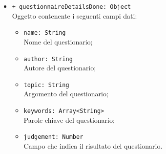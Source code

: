 \begin{itemize}
\begin{itemize}
			\item \texttt{+ questionnaireDetailsDone: Object} \\ Oggetto contenente i seguenti campi dati:
			\begin{itemize}
				\item \texttt{name: String}\\ Nome del questionario;
				\item \texttt{author: String}\\ Autore del questionario;
				\item \texttt{topic: String}\\ Argomento del questionario;
				\item \texttt{keywords: Array<String>}\\ Parole chiave del questionario;
				\item \texttt{judgement: Number} \\ Campo che indica il risultato del questionario.
			\end{itemize}
		\end{itemize}
	\end{itemize}
	
		